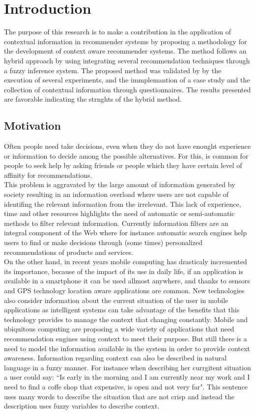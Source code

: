 \chapter{Introduction} \label{introduction} 

The purpose of this research is to make a contribution in the 
application of contextual information in recommender systems by proposing a methodology for
the development of context aware recommender systems.
The method follows an hybrid  approach by using integrating several
recommendation techniques through a
fuzzy inference system. The proposed method was validated by 
by the execution of several experiments, and the immplemantion of
a case study and the collection of contextual
information through questionnaires. The results presented are favorable 
indicating the strnghts of the hybrid method.

\section{Motivation}

Often people need take decisions, even when they do not
have enought experience or information to decide among the possible alternatives. 
For this, is common for people to seek help by asking friends or people which they  
have certain level of affinity for recommendations.\\
This problem is aggravated by the large amount of information generated by society 
resulting in an information overload where users are not capable of
identifing the relevant information from the irrelevant.
This lack of experience, time and other resources 
highlights the need of automatic or semi-automatic methods 
to filter relevant information. Currently information filters are
an integral component of the Web where for instance
automatic search engines help users to find or make decisions through 
(some times) personalized recommendations
of products and services. \\ On the other hand, in recent
years  mobile computing has drasticaly incremented its importance, 
because of the impact of its use in daily life, if an application 
is available in a smartphone it can be used allmost anywhere, and thanks
to sensors and GPS technology location aware applications are common.
New technologies also consider information about the current situation of the
user in mobile applications as intelligent systems can take advantage of the
benefits that this technology provides to manage the context that changing
constantly. Mobile and ubiquitous computing\cite{noguera2012mobile}
\cite{chiou2010adaptive} are proposing a wide variety of applications
that need recommendation engines using context to meet their
purpose. But still there is a need to model the information available in
the system in order to provide context awareness. Information regarding 
context can also be described in natural language in a fuzzy manner. For
instance when describing her currgitent situation a user could say: ``Is early in
the morning and I am currently near my work and I need to find a coffe
shop that expensive, is open and not very far". This sentence uses many words to describe
the situation that are not crisp and instead the description uses fuzzy variables
to describe context.  


